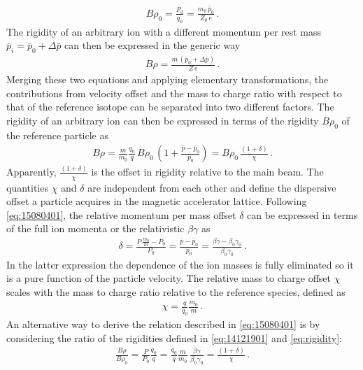 \begin{align}
B  \rho_0 = \frac{P_0}{q_0} = \frac{m_0 \, \bar{p}_0}{Z_0 \, e} \, . \label{eq:14121901}
\end{align}
The rigidity of an arbitrary ion with a different momentum per rest mass $\bar{p}_i = \bar{p}_0 + \Delta \bar{p}$ can then be expressed in the generic way
\begin{align}
B \rho = \frac{m \, (\bar{p}_0 + \Delta \bar{p})}{Z \, e} \, .
\end{align} 
Merging these two equations and applying elementary transformations, the contributions from velocity offset and the mass to charge ratio with respect to that of the reference isotope can be separated into two different factors. The rigidity of an arbitrary ion can then be expressed in terms of the rigidity $B \rho_0$ of the reference particle as
\begin{align}
B  \rho = \frac{m}{m_0} \frac{q_0}{q} \, B  \rho_0 \, \left( 1 + \frac{\bar{p} - \bar{p}_0}{\bar{p}_0} \right) =  B  \rho_0 \, \frac{\left( 1 + \delta \right)}{\chi}  \, . \label{eq:15080401}
\end{align}
Apparently, $\frac{(1+\delta)}{\chi}$ is the offset in rigidity relative to the main beam. The quantities $\chi$ and $\delta$ are independent from each other and define the dispersive offset a particle acquires in the magnetic accelerator lattice. Following \eqref{eq:15080401}, the relative momentum per mass offset $\delta$ can be expressed in terms of the full ion momenta or the relativistic $\beta \gamma$ as
\begin{align}
\delta = \frac{P \, \frac{m_0}{m} - P_0}{P_0} = \frac{\bar{p} - \bar{p}_0}{\bar{p}_0} = \frac{\beta \gamma - \beta_0 \gamma_0}{\beta_0 \gamma_0} \, . \label{eq:15010701}
\end{align}
In the latter expression the dependence of the ion masses is fully eliminated so it is a pure function of the particle velocity. The relative mass to charge offset $\chi$ scales with the mass to charge ratio relative to the reference species, defined as
\begin{align}
\chi =  \frac{q}{q_0}  \frac{m_0}{m}\, .	\label{eq:chidef}
\end{align}
%
An alternative way to derive the relation described in \eqref{eq:15080401} is by considering the ratio of the rigidities defined in \eqref{eq:14121901} and \eqref{eq:rigidity}:
\begin{align}
\frac{B \rho}{B \rho_0} = \frac{P}{P_0} \frac{q_0}{q} = \frac{q_0}{q} \frac{m}{m_0} \, \frac{\beta \gamma}{\beta_0 \gamma_0} = \frac{(1+\delta)}{\chi} \, . \label{eq:brho_brho0}
\end{align}
